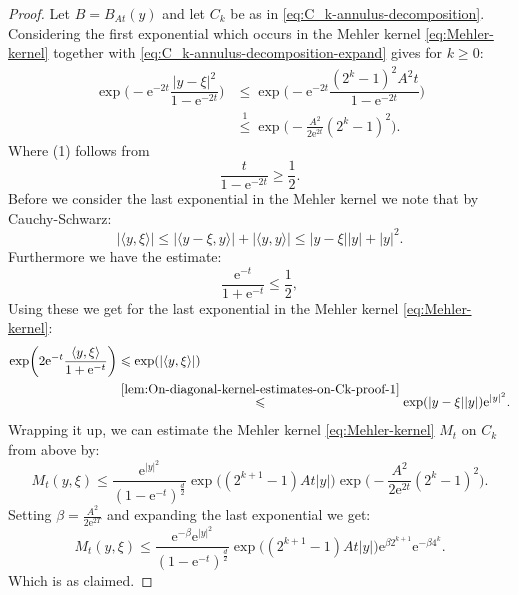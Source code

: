 \documentclass[a4paper,oneside,10pt]{amsproc}
\theoremstyle{remark}
\newcommand{\la}{\langle}
\newcommand{\ra}{\rangle}
\renewcommand{\leq}{\leqslant}
\renewcommand{\leq}{\leqslant}
\renewcommand{\geq}{\geqslant}
\newcommand{\e}{\mathrm{e}} %
\renewcommand{\leq}{\leqslant}%
\renewcommand{\geq}{\geqslant}%
\begin{document}
\begin{proof}
  Let $B = B_{At}(y)$ and let $C_k$ be as in
  \eqref{eq:C_k-annulus-decomposition}. Considering the first
  exponential which occurs in the Mehler kernel
  \eqref{eq:Mehler-kernel} together with
  \eqref{eq:C_k-annulus-decomposition-expand} gives for $k \geq 0$:
  \begin{align*}
    \exp\biggl(-\e^{-2t} \dfrac{|y - \xi|^2}{1 - \e^{-2t}} \biggr)
    &\leq \exp\biggl(-\e^{-2t} \dfrac{(2^k - 1)^2 A^2 t}{1 - \e^{-2t}} \biggr)\\
    &\overset{1}{\leq} \exp\biggl(-\frac{A^2}{2 \e^{2t}} (2^k - 1)^2 \biggr).
  \end{align*}
  Where (1) follows from
  \begin{equation*}
    \frac{t}{1 - \e^{-2t}} \geq \frac12.
  \end{equation*}
  Before we consider the last exponential in the Mehler kernel we note
  that by Cauchy-Schwarz:
  \begin{equation}
    \label{lem:On-diagonal-kernel-estimates-on-Ck-proof-1}
    |\langle y, \xi \rangle| \leq |\la y - \xi, y \ra| + |\la y, y \ra|
    \leq |y - \xi||y| + |y|^2.
  \end{equation}
  Furthermore we have the estimate:
  \begin{equation*}
    \frac{\e^{-t}}{1 + \e^{-t}} \leq \frac12, 
  \end{equation*}
  Using these we get for the last exponential in the Mehler kernel
  \eqref{eq:Mehler-kernel}:
  \begin{align*}
    \exp\biggl(2\e^{-t} \dfrac{\la y, \xi \ra}{1 + \e^{-t}}
    \biggr) &\leq \exp(|\la y, \xi \ra|)\\
    &\stackrel{\eqref{lem:On-diagonal-kernel-estimates-on-Ck-proof-1}}{\leq}
    \exp(|y - \xi||y|) \e^{|y|^2}.
  \end{align*}
  Wrapping it up, we can estimate the Mehler kernel
  \eqref{eq:Mehler-kernel} $M_t$ on $C_k$ from above by:
  \begin{equation*}
    M_t(y, \xi) \leq \frac{\e^{|y|^2}}{(1 - \e^{-t})^{\frac{d}2}}
    \exp\bigl((2^{k + 1} - 1) A t |y| \bigr) \exp\biggl(-\frac{A^2}{2 \e^{2t}} (2^k - 1)^2 \biggr).
  \end{equation*}
  Setting $\beta = \frac{A^2}{2 \e^{2T}}$ and expanding the last
  exponential we get:
  \begin{equation*}
    M_t(y, \xi) \leq \frac{\e^{-\beta} \e^{|y|^2}}{(1 - \e^{-t})^{\frac{d}2}}
    \exp\bigl((2^{k + 1} - 1) A t |y| \bigr) \e^{\beta 2^{k + 1}} \e^{-\beta 4^k}.
  \end{equation*}
  Which is as claimed.


\end{proof}
\end{document}
